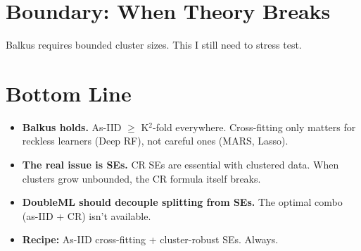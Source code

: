 \documentclass[11pt,a4paper]{article}
\begin{document}
\section{Boundary: When Theory Breaks}

Balkus requires bounded cluster sizes. This I still need to stress test.


\section{Bottom Line}

\begin{itemize}[leftmargin=1.5em, nosep]
  \item \textbf{Balkus holds.} As-IID $\geq$ K$^2$-fold everywhere. Cross-fitting only matters for reckless learners (Deep RF), not careful ones (MARS, Lasso).
  \item \textbf{The real issue is SEs.} CR SEs are essential with clustered data. When clusters grow unbounded, the CR formula itself breaks.
  \item \textbf{DoubleML should decouple splitting from SEs.} The optimal combo (as-IID + CR) isn't available.
  \item \textbf{Recipe:} As-IID cross-fitting + cluster-robust SEs. Always.
\end{itemize}




\end{document}
